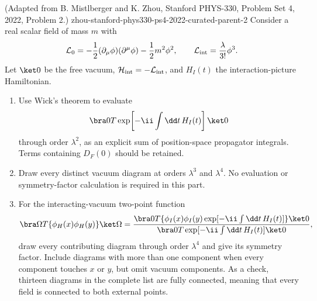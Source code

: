 \begin{enumerate}
  {(Adapted from B. Mistlberger and K. Zhou, Stanford PHYS-330, Problem Set 4, 2022, Problem 2.)}
  {zhou-stanford-phys330-ps4-2022-curated-parent-2}
Consider a real scalar field of mass \(m\) with
\[
 \mathcal L_0=-\frac12(\partial_\mu\phi)(\partial^\mu\phi)
 -\frac12m^2\phi^2,
 \qquad
 \mathcal L_{\rm int}=\frac{\lambda}{3!}\phi^3.
\]
Let \(\ket0\) be the free vacuum,
\(\mathcal H_{\rm int}=-\mathcal L_{\rm int}\), and \(H_I(t)\) the
interaction-picture Hamiltonian.
\begin{enumerate}
\item
Use Wick's theorem to evaluate
\[
 \bra0T\exp\!\left[-\ii\int \dd t\,H_I(t)\right]\ket0
\]
through order \(\lambda^2\), as an explicit sum of position-space
propagator integrals.  Terms containing \(D_F(0)\) should be retained.
\item
Draw every distinct vacuum diagram at orders \(\lambda^3\) and
\(\lambda^4\).  No evaluation or symmetry-factor calculation is required
in this part.
\item
For the interacting-vacuum two-point function
\[
 \bra\Omega T\{\phi_H(x)\phi_H(y)\}\ket\Omega
 =
 \frac{\bra0T\{\phi_I(x)\phi_I(y)
 \exp[-\ii\int \dd t\,H_I(t)]\}\ket0}
 {\bra0T\exp[-\ii\int \dd t\,H_I(t)]\ket0},
\]
draw every contributing diagram through order \(\lambda^4\) and give
its symmetry factor.  Include diagrams with more than one component
when every component touches \(x\) or \(y\), but omit vacuum components.
As a check, thirteen diagrams in the complete list are fully connected,
meaning that every field is connected to both external points.
\end{enumerate}


\end{enumerate}

